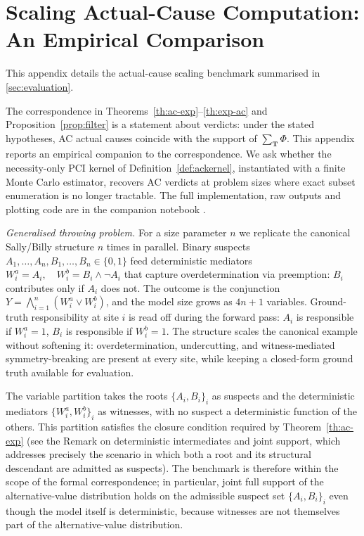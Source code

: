 \section{Scaling Actual-Cause Computation: An Empirical Comparison}\label{sec:ac_benchmark}

This appendix details the actual-cause scaling benchmark summarised in \cref{sec:evaluation}.

The correspondence in Theorems~\ref{th:ac-exp}--\ref{th:exp-ac} and
Proposition~\ref{prop:filter} is a statement about verdicts: under the stated
hypotheses, AC actual causes coincide with the support of $\sum_{\mathbf{T}}\Phi$.
This appendix reports an empirical companion to the correspondence. We ask whether
the necessity-only PCI kernel of Definition~\ref{def:ackernel}, instantiated with a
finite Monte Carlo estimator, recovers AC verdicts at problem sizes where exact
subset enumeration is no longer tractable. The full implementation, raw outputs and
plotting code are in the companion notebook
.

\medskip\noindent\textit{Generalised throwing problem.}
For a size parameter $n$ we replicate the canonical Sally/Billy structure $n$ times
in parallel. Binary suspects $A_1,\dots,A_n,B_1,\dots,B_n\in\{0,1\}$ feed
deterministic mediators
\(W^a_i = A_i,\quad W^b_i = B_i \land \lnot A_i\)
that capture overdetermination via preemption: $B_i$ contributes only if $A_i$ does
not. The outcome is the conjunction $Y = \bigwedge_{i=1}^{n} (W^a_i \lor W^b_i)$, and
the model size grows as $4n+1$ variables. Ground-truth responsibility at site $i$ is
read off during the forward pass: $A_i$ is responsible if $W^a_i=1$, $B_i$ is
responsible if $W^b_i=1$. The structure scales the canonical example without softening it: overdetermination,
undercutting, and witness-mediated symmetry-breaking are present at every site,
while keeping a closed-form ground truth available for evaluation.

The variable partition takes the roots $\{A_i,B_i\}_i$ as suspects and the
deterministic mediators $\{W^a_i,W^b_i\}_i$ as witnesses, with no suspect a
deterministic function of the others. This partition satisfies the closure
condition required by Theorem~\ref{th:ac-exp} (see the Remark on deterministic
intermediates and joint support, which addresses precisely the scenario in which
both a root and its structural descendant are admitted as suspects). The
benchmark is therefore within the scope of the formal correspondence; in
particular, joint full support of the alternative-value distribution holds on the
admissible suspect set $\{A_i,B_i\}_i$ even though the model itself is
deterministic, because witnesses are not themselves part of the alternative-value
distribution.

